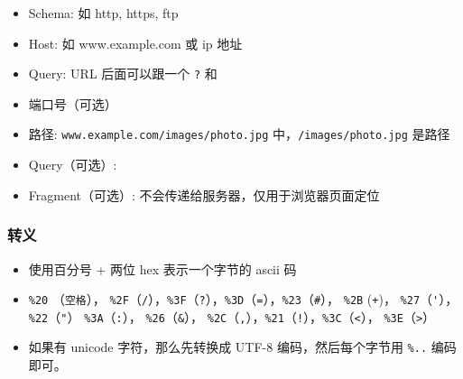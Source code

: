 

\begin{issues}
\issueDraft
\end{issues}

\begin{itemize}
\item Schema: 如 http, https, ftp
\item Host: 如 www.example.com 或 ip 地址
\item Query: URL 后面可以跟一个 \verb`?` 和
\item 端口号（可选）
\item 路径: \verb`www.example.com/images/photo.jpg` 中，\verb`/images/photo.jpg` 是路径
\item Query（可选）:
\item Fragment（可选）: 不会传递给服务器，仅用于浏览器页面定位
\end{itemize}

\subsubsection{转义}
\begin{itemize}
\item 使用百分号 + 两位 hex 表示一个字节的 ascii 码
\item \verb`%20` （\verb`空格`）， \verb`%2F`（\verb`/`），\verb`%3F`（\verb`?`），\verb`%3D`（\verb`=`），\verb`%23`（\verb`#`）， \verb`%2B` (\verb`+`)， \verb`%27`（\verb`'`），\verb`%22`（\verb`"`） \verb`%3A`（\verb`:`）， \verb`%26`（\verb`&`）， \verb`%2C`（\verb`,`），\verb`%21`（\verb`!`），\verb`%3C`（\verb`<`）， \verb`%3E`（\verb`>`）
\item 如果有 unicode 字符，那么先转换成 UTF-8 编码，然后每个字节用 \verb`%..` 编码即可。
\end{itemize}
